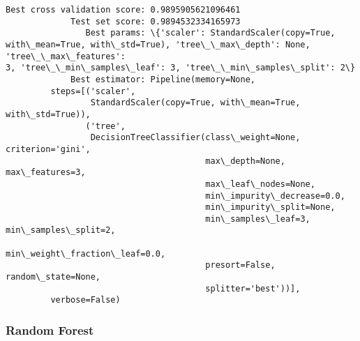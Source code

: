 \documentclass[11pt]{article}
\begin{document}
    \begin{Verbatim}[commandchars=\\\{\}]
Best cross validation score: 0.9895905621096461
             Test set score: 0.9894532334165973
                Best params: \{'scaler': StandardScaler(copy=True,
with\_mean=True, with\_std=True), 'tree\_\_max\_depth': None, 'tree\_\_max\_features':
3, 'tree\_\_min\_samples\_leaf': 3, 'tree\_\_min\_samples\_split': 2\}
             Best estimator: Pipeline(memory=None,
         steps=[('scaler',
                 StandardScaler(copy=True, with\_mean=True, with\_std=True)),
                ('tree',
                 DecisionTreeClassifier(class\_weight=None, criterion='gini',
                                        max\_depth=None, max\_features=3,
                                        max\_leaf\_nodes=None,
                                        min\_impurity\_decrease=0.0,
                                        min\_impurity\_split=None,
                                        min\_samples\_leaf=3, min\_samples\_split=2,
                                        min\_weight\_fraction\_leaf=0.0,
                                        presort=False, random\_state=None,
                                        splitter='best'))],
         verbose=False)
\end{Verbatim}

    \hypertarget{random-forest}{%
\subsubsection{Random Forest}\label{random-forest}}
\end{document}

